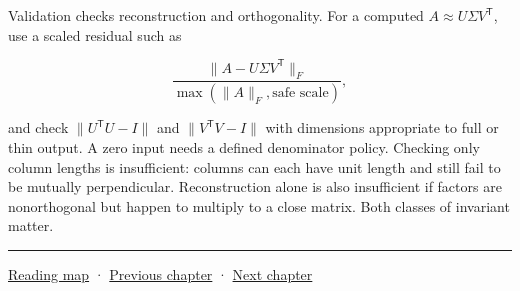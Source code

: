 Validation checks reconstruction and orthogonality. For a computed \(A\approx U\Sigma V^\mathsf T\), use a scaled residual such as

\[
\frac{\|A-U\Sigma V^\mathsf T\|_F}
{\max(\|A\|_F,\text{safe scale})},
\]

and check \(\|U^\mathsf TU-I\|\) and \(\|V^\mathsf TV-I\|\) with dimensions appropriate to full or thin output. A zero input needs a defined denominator policy. Checking only column lengths is insufficient: columns can each have unit length and still fail to be mutually perpendicular. Reconstruction alone is also insufficient if factors are nonorthogonal but happen to multiply to a close matrix. Both classes of invariant matter.

\begin{center}\rule{0.5\linewidth}{0.5pt}\end{center}

\hyperref[volume-reading-map]{Reading map} · \hyperref[02-foundations-ii-ch023]{Previous chapter} · \hyperref[02-foundations-ii-ch025]{Next chapter}
